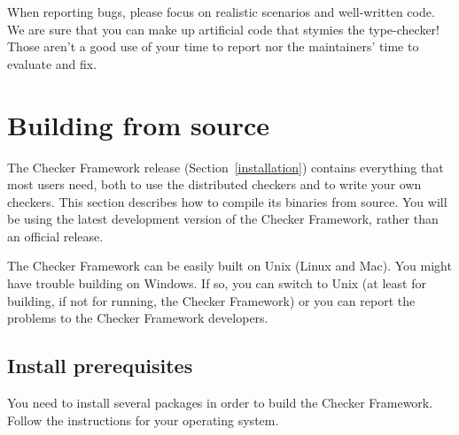 When reporting bugs, please focus on realistic scenarios and well-written
code.  We are sure that you can make up artificial code that stymies the
type-checker!  Those aren't a good use of your time to report nor the
maintainers' time to evaluate and fix.


\section{Building from source\label{build-source}}

The Checker Framework release (Section~\ref{installation}) contains
everything that most users need, both to use the distributed checkers and
to write your own checkers.  This section describes how to compile its
binaries from source.  You will be using the latest development version of
the Checker Framework, rather than an official release.


The Checker Framework can be easily built on Unix (Linux and Mac).  You
might have trouble building on Windows.  If so, you can switch to Unix (at
least for building, if not for running, the Checker Framework) or you can
report the problems to the Checker Framework developers.


\subsection{Install prerequisites\label{building-prerequisites}}

You need to install several packages in order to build the Checker
Framework.
Follow the instructions for your operating system.

